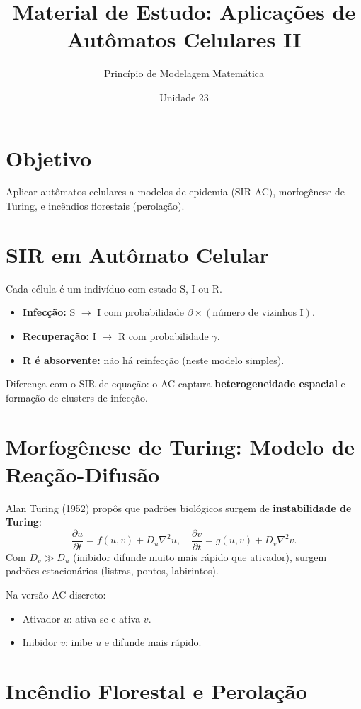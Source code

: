\documentclass[12pt,a4paper]{article}
\title{Material de Estudo: Aplica\c{c}\~oes de Aut\^omatos Celulares II}
\author{Princ\'ipio de Modelagem Matem\'atica}
\date{Unidade 23}
\begin{document}
\maketitle

\section*{Objetivo}
Aplicar aut\^omatos celulares a modelos de epidemia (SIR-AC), morfog\^enese de Turing, e inc\^endios florestais (perola\c{c}\~ao).

\section*{SIR em Aut\^omato Celular}

Cada c\'elula \'e um indiv\'iduo com estado S, I ou R.
\begin{itemize}
  \item \textbf{Infec\c{c}\~ao:} S $\to$ I com probabilidade $\beta \times (\text{n\'umero de vizinhos I})$.
  \item \textbf{Recupera\c{c}\~ao:} I $\to$ R com probabilidade $\gamma$.
  \item \textbf{R \'e absorvente:} n\~ao h\'a reinfec\c{c}\~ao (neste modelo simples).
\end{itemize}
Diferen\c{c}a com o SIR de equa\c{c}\~ao: o AC captura \textbf{heterogeneidade espacial} e forma\c{c}\~ao de clusters de infec\c{c}\~ao.

\section*{Morfog\^enese de Turing: Modelo de Rea\c{c}\~ao-Difus\~ao}

Alan Turing (1952) propôs que padr\~oes biol\'ogicos surgem de \textbf{instabilidade de Turing}:
\[
\frac{\partial u}{\partial t} = f(u,v) + D_u\nabla^2 u, \quad \frac{\partial v}{\partial t} = g(u,v) + D_v\nabla^2 v.
\]
Com $D_v \gg D_u$ (inibidor difunde muito mais r\'apido que ativador), surgem padr\~oes estacion\'arios (listras, pontos, labirintos).

Na versão AC discreto:
\begin{itemize}
  \item Ativador $u$: ativa-se e ativa $v$.
  \item Inibidor $v$: inibe $u$ e difunde mais r\'apido.
\end{itemize}

\section*{Inc\^endio Florestal e Perola\c{c}\~ao}
\end{document}

